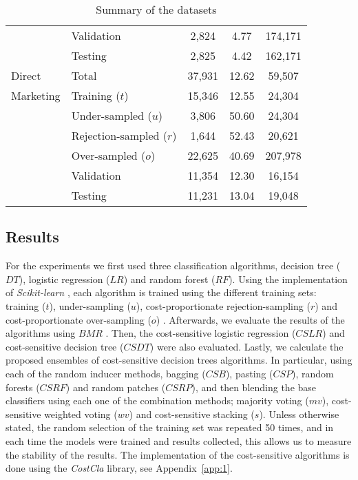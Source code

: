 \begin{table}
\begin{tabular}{l l c c c }
    &Validation&2,824&4.77&174,171\\
    &Testing&2,825&4.42&162,171\\
    \hline
    Direct &Total&37,931&12.62&59,507\\
    Marketing&Training ($t$)&15,346&12.55&24,304\\
    &Under-sampled ($u$)&3,806&50.60&24,304\\
    &Rejection-sampled ($r$)&1,644&52.43&20,621\\
    &Over-sampled ($o$)&22,625&40.69&207,978\\
    &Validation&11,354&12.30&16,154\\
    &Testing&11,231&13.04&19,048\\
    \hline
  \end{tabular}
  \caption{Summary of the datasets}
  \label{tab:6:databases}
\end{table}
 


\subsection{Results}


  For the experiments we first used three classification algorithms, decision tree ($DT$), logistic 
  regression ($LR$) and random forest ($RF$). Using the implementation of \textit{Scikit-learn} 
  \citep{Pedregosa2011}, each algorithm is trained using the different training sets: training 
  ($t$), under-sampling ($u$), cost-proportionate rejection-sampling  ($r$) \citep{Zadrozny2003}   
  and   cost-proportionate over-sampling ($o$) \citep{Elkan2001}. Afterwards,  we evaluate the 
  results of  the algorithms using $BMR$ \citep{CorreaBahnsen2014}. Then, the cost-sensitive 
  logistic  regression ($CSLR$) \citep{CorreaBahnsen2014b} and cost-sensitive decision tree 
  ($CSDT$) \citep{CorreaBahnsen2015} were also evaluated. Lastly, we calculate the 
  proposed ensembles of cost-sensitive decision trees algorithms. In particular, using each of the 
  random inducer methods, bagging ($CSB$), pasting ($CSP$), random forests ($CSRF$) and random 
  patches ($CSRP$), and then blending the base classifiers using each one of the combination 
  methods; majority voting ($mv$), cost-sensitive weighted voting ($wv$) and cost-sensitive 
  stacking ($s$). Unless otherwise stated, the random selection of the training set was repeated 50 
  times, and in each time the models were trained and results collected, this allows us to measure 
  the stability of the results. The implementation of the cost-sensitive algorithms is done using 
  the \textit{CostCla} library, see Appendix~\ref{app:1}.
  
